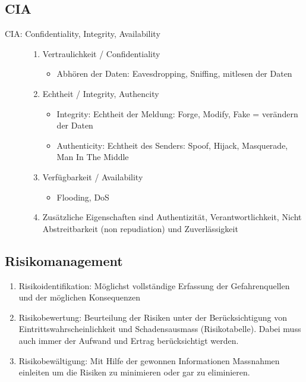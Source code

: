\subsection{CIA}
\begin{description}
		\item[CIA: Confidentiality, Integrity, Availability] \hfill
		\begin{enumerate}
			\item Vertraulichkeit / Confidentiality
			\begin{itemize}
				\item Abhören der Daten: Eavesdropping, Sniffing, mitlesen der Daten
			\end{itemize}
			\item Echtheit / Integrity, Authencity
			\begin{itemize}
				\item Integrity: Echtheit der Meldung: Forge, Modify, Fake = verändern der Daten
				\item Authenticity: Echtheit des Senders: Spoof, Hijack, Masquerade, Man In The Middle
			\end{itemize}
			\item Verfügbarkeit / Availability
			\begin{itemize}
				\item Flooding, DoS
			\end{itemize}
			\item Zusätzliche Eigenschaften sind Authentizität, Verantwortlichkeit, Nicht Abstreitbarkeit (non repudiation) und Zuverlässigkeit
		\end{enumerate}	
\end{description}

\subsection{Risikomanagement}
\begin{enumerate}
	\item Risikoidentifikation: Möglichst vollständige Erfassung der Gefahrenquellen und der möglichen Konsequenzen
	\item Risikobewertung: Beurteilung der Risiken unter der Berücksichtigung von Eintrittswahrscheinlichkeit und Schadensausmass (Risikotabelle). Dabei muss auch immer der Aufwand und Ertrag berücksichtigt werden.
	\item Risikobewältigung: Mit Hilfe der gewonnen Informationen Massnahmen einleiten um die Risiken zu minimieren oder gar zu eliminieren.
\end{enumerate}

